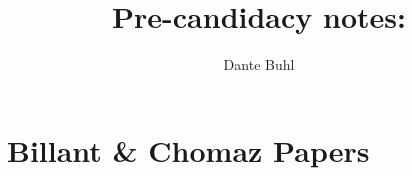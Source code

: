 \documentclass{article}
\begin{document}
\title{Pre-candidacy notes: }
\author{Dante Buhl}

\newcommand{\wrms}{w_{\text{rms}}}
\newcommand{\bs}[1]{\boldsymbol{#1}}
\newcommand{\tb}[1]{\textbf{#1}}
\newcommand{\bmp}[1]{\begin{minipage}{#1\textwidth}}
\newcommand{\emp}{\end{minipage}}
\newcommand{\R}{\mathbb{R}}
\newcommand{\C}{\mathbb{C}}
\newcommand{\N}{\mathcal{N}}
\newcommand{\K}{\bs{\mathrm{K}}}
\newcommand{\m}{\bs{\mu}_*}
\newcommand{\s}{\bs{\Sigma}_*}
\newcommand{\dt}{\Delta t}
\newcommand{\dx}{\Delta x}
\newcommand{\tr}[1]{\text{Tr}(#1)}
\newcommand{\Tr}[1]{\text{Tr}(#1)}
\newcommand{\Div}{\nabla \cdot}
\renewcommand{\div}{\nabla \cdot}
\newcommand{\Curl}{\nabla \times}
\newcommand{\Grad}{\nabla}
\newcommand{\grad}{\nabla}
\newcommand{\grads}{\nabla_s}
\newcommand{\gradf}{\nabla_f}
\newcommand{\xs}{x_s}
\newcommand{\xf}{x_f}
\newcommand{\ts}{t_s}
\newcommand{\tf}{t_f}
\newcommand{\pt}{\partial t}
\newcommand{\pz}{\partial z}
\newcommand{\uvec}{\bs{u}}
\newcommand{\F}{\bs{F}}
\newcommand{\T}{\tilde{T}}
\newcommand{\ez}{\bs{e}_z}
\newcommand{\ex}{\bs{e}_x}
\newcommand{\ey}{\bs{e}_y}
\newcommand{\eo}{\bs{e}_{\bs{\Omega}}}
\newcommand{\ppt}[1]{\frac{\partial #1}{\partial t}}
\newcommand{\DDt}[1]{\frac{D #1}{D t}}
\newcommand{\ppts}[1]{\frac{\partial #1}{\partial t_s}}
\newcommand{\pptf}[1]{\frac{\partial #1}{\partial t_f}}
\newcommand{\ppz}[1]{\frac{\partial #1}{\partial z}}
\newcommand{\ddz}[1]{\frac{d #1}{d z}}
\newcommand{\ppzetas}[1]{\frac{\partial^2 #1}{\partial \zeta^2}}
\newcommand{\ppzs}[1]{\frac{\partial #1}{\partial z_s}}
\newcommand{\ppzf}[1]{\frac{\partial #1}{\partial z_f}}
\newcommand{\ppx}[1]{\frac{\partial #1}{\partial x}}
\newcommand{\ppxi}[1]{\frac{\partial #1}{\partial x_i}}
\newcommand{\ppxj}[1]{\frac{\partial #1}{\partial x_j}}
\newcommand{\ppy}[1]{\frac{\partial #1}{\partial y}}
\newcommand{\ppzeta}[1]{\frac{\partial #1}{\partial \zeta}}


\maketitle 
\setlength{\parindent}{0pt}

\section{Billant \& Chomaz Papers}
\end{document}
